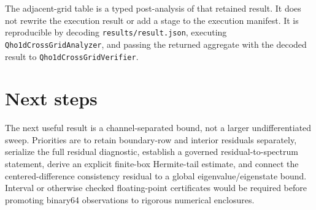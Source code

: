 \documentclass[11pt]{article}
\newcommand{\code}[1]{\texttt{#1}}
\begin{document}
The adjacent-grid table is a typed post-analysis of that retained result.  It does not
rewrite the execution result or add a stage to the execution manifest.  It is
reproducible by decoding \code{results/result.json}, executing
\code{Qho1dCrossGridAnalyzer}, and passing the returned aggregate with the decoded
result to \code{Qho1dCrossGridVerifier}.

\section{Next steps}

The next useful result is a channel-separated bound, not a larger undifferentiated
sweep.  Priorities are to retain boundary-row and interior residuals separately,
serialize the full residual diagnostic, establish a governed residual-to-spectrum
statement, derive an explicit finite-box Hermite-tail estimate, and connect the
centered-difference consistency residual to a global eigenvalue/eigenstate bound.
Interval or otherwise checked floating-point certificates would be required before
promoting binary64 observations to rigorous numerical enclosures.



\end{document}

